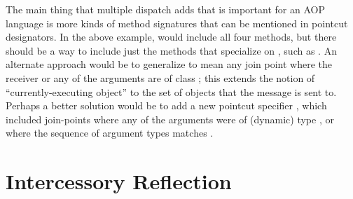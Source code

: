 \documentclass[12pt]{article}
\begin{document}

The main thing that multiple dispatch adds that is important for an
AOP language is more kinds of method signatures that can be mentioned in
pointcut designators.  In the above example, 
would include all four methods, but there should be a way to include
just the methods that specialize on , such as
.  An alternate approach would be to
generalize  to mean any join point where the
receiver or any of the arguments are of class ; this extends
the notion of ``currently-executing object'' to the set of objects that
the message is sent to.  Perhaps a better solution would be to add a
new pointcut specifier , which included
join-points where any of the arguments were of (dynamic) type
, or  where the sequence
of argument types matches .

\section{Intercessory Reflection}

\end{document}
